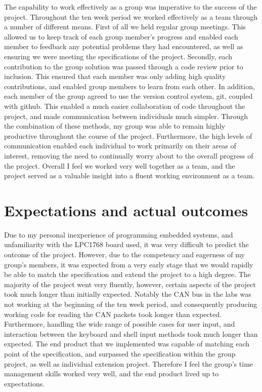The capability to work effectively as a group was imperative to the success of
the project. 
Throughout the ten week period we worked effectively as a team through a number 
of different means. 
First of all we held regular group meetings. This allowed us to keep track of 
each group member's progress and enabled each member to feedback any potential 
problems they had encountered, as well as ensuring we were meeting the 
specifications of the project. 
Secondly, each contribution to the group solution was passed through a code 
review prior to inclusion. 
This ensured that each member was only adding high 
quality contributions, and enabled group members to learn from each other.
In addition, each member of the group agreed to use the version control system, 
git, coupled with github. This enabled a much easier collaboration of code 
throughout the project, and made communication between individuals much simpler. 
Through the combination of these methods, my group was able to remain highly 
productive throughout the course of the project.
Furthermore, the high levels of communication enabled each individual to work 
primarily on their areas of interest, removing the need to continually worry 
about to the overall progress of the project. 
Overall I feel we worked very well together as a team, and the project served 
as a valuable insight into a fluent working environment as a team. 

\section{Expectations and actual outcomes}

Due to my personal inexperience of programming embedded systems, and 
unfamiliarity with the LPC1768 board used, it was very difficult to predict the 
outcome of the project. 
However, due to the competency and eagerness of my group's members, it was 
expected from a very early stage that we would rapidly be able to match the 
specification and extend the project to a high degree. 
The majority of the project went very fluently, however, certain aspects of the 
project took much longer than initially expected. 
Notably the CAN bus in the labs was not working at the beginning of the ten week
period, and consequently producing working code for reading the CAN packets took 
longer than expected. 
Furthermore, handling the wide range of possible cases for 
user input, and interaction between the keyboard and shell input methods took much 
longer than expected. 
The end product that we implemented was capable of matching each point of the 
specification, and surpassed the specification within the group project, 
as well as individual extension project. 
Therefore I feel the group's time management skills worked very well, and the end 
product lived up to expectations.

